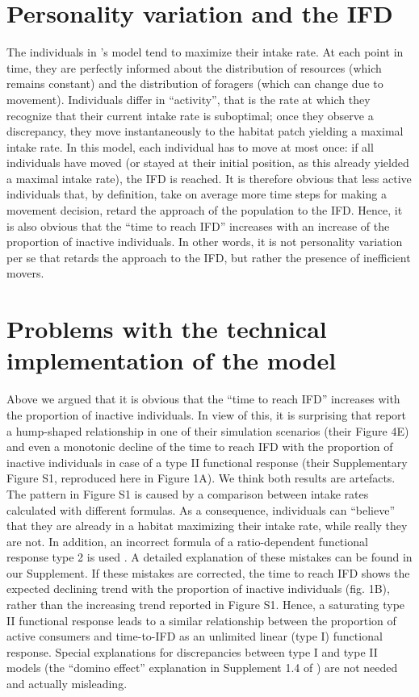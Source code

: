 \begin{refsection}
	\section*{Personality variation and the IFD}
	
	The individuals in \citeauthor{dinuzzo2020}'s model tend to maximize their intake rate.
	At each point in time, they are perfectly informed about the distribution of resources (which remains constant) and the distribution of foragers (which can change due to movement).
	Individuals differ in ``activity'', that is the rate at which they recognize that their current intake rate is suboptimal; once they observe a discrepancy, they move instantaneously to the habitat patch yielding a maximal intake rate.
	In this model, each individual has to move at most once: if all individuals have moved (or stayed at their initial position, as this already yielded a maximal intake rate), the IFD is reached.
	It is therefore obvious that less active individuals that, by definition, take on average more time steps for making a movement decision, retard the approach of the population to the IFD.
	Hence, it is also obvious that the ``time to reach IFD'' increases with an increase of the proportion of inactive individuals.
	In other words, it is not personality variation per se that retards the approach to the IFD, but rather the presence of inefficient movers.

	\section*{Problems with the technical implementation of the model}

	Above we argued that it is obvious that the ``time to reach IFD'' increases with the proportion of inactive individuals.
	In view of this, it is surprising that \citeauthor{dinuzzo2020} report a hump-shaped relationship in one of their simulation scenarios (their Figure 4E) and even a monotonic decline of the time to reach IFD with the proportion of inactive individuals in case of a type II functional response (their Supplementary Figure S1, reproduced here in Figure 1A).
	We think both results are artefacts.
	The pattern in Figure S1 is caused by a comparison between intake rates calculated with different formulas.
	As a consequence, individuals can “believe” that they are already in a habitat maximizing their intake rate, while really they are not.
	In addition, an incorrect formula of a ratio-dependent functional response type 2 is used \citep[following][]{abrams2000}.
	A detailed explanation of these mistakes can be found in our Supplement.
	If these mistakes are corrected, the time to reach IFD shows the expected declining trend with the proportion of inactive individuals (fig. 1B), rather than the increasing trend reported in Figure S1.
	Hence, a saturating type II functional response leads to a similar relationship between the proportion of active consumers and time-to-IFD as an unlimited linear (type I) functional response.
	Special explanations for discrepancies between type I and type II models (the ``domino effect'' explanation in Supplement 1.4 of \cite{dinuzzo2020}) are not needed and actually misleading.
	

\end{refsection}
